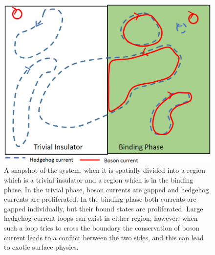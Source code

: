 \begin{figure}
\includegraphics[width=0.6\linewidth]{figures/surface.eps}
\caption{A snapshot of the system, when it is spatially divided into a region which is a trivial insulator and a region which is in the binding phase. In the trivial phase, boson currents are gapped and hedgehog currents are proliferated. In the binding phase both currents are gapped individually, but their bound states are proliferated. Large hedgehog current loops can exist in either region; however, when such a loop tries to cross the boundary the conservation of boson current leads to a conflict between the two sides, and this can lead to exotic surface physics. }
\label{surface}
\end{figure}


